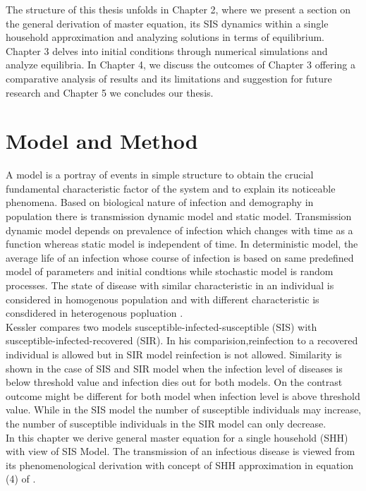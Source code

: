 \documentclass[paper=a4, fontsize=11pt, twoside, BCOR=12mm, parskip=full, listof=totoc]{scrreprt}
\begin{document}
The structure of this thesis unfolds in Chapter 2, where we present a section on the general derivation of master equation, its SIS dynamics within a single household approximation and analyzing solutions in terms of equilibrium. Chapter 3 delves into initial conditions through numerical simulations and analyze equilibria. In Chapter 4, we discuss the outcomes of Chapter 3 offering a comparative analysis of results and its limitations and suggestion for future research and Chapter 5 we concludes our thesis.

\chapter{Model and Method}
A model is a portray of events in simple structure to obtain the crucial fundamental characteristic factor of the system and to explain its noticeable phenomena. Based on biological nature of infection and demography in population there is transmission dynamic model and static model. Transmission dynamic model depends on prevalence of infection which changes with time as a function whereas static model is independent of time. In deterministic model, the average life of an infection whose course of infection is based on same predefined model of parameters and initial condtions while stochastic model is random processes. The state of disease with similar characteristic in an individual is considered in homogenous population and with different characteristic is consdidered in heterogenous popluation \cite{Mishraetal}.\\ 

Kessler \cite{kessler2008epidemic} compares two models susceptible-infected-susceptible (SIS) with susceptible-infected-recovered (SIR). In his comparision,reinfection to a recovered individual is allowed but in SIR model reinfection is not allowed. Similarity is shown in the case of SIS and SIR model when the infection level of diseases is below threshold value and infection dies out for both models. On the contrast outcome might be different for both model when infection level is above threshold value. While in the SIS model the number of susceptible individuals may increase, the number of susceptible individuals in the SIR model can only decrease.\\

 In this chapter we derive general master equation for a single household (SHH) with view of SIS Model. The transmission of an infectious disease is viewed from its phenomenological derivation with concept of SHH approximation in equation (4) of \cite{holmes2022approximating}. 
\end{document}
